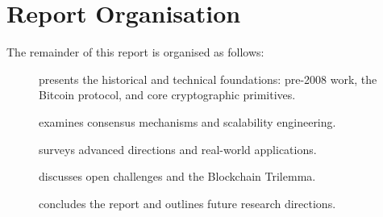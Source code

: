 \section{Report Organisation}

The remainder of this report is organised as follows:
\begin{description}
    \item[] presents the historical and technical foundations: pre-2008 work, the Bitcoin protocol, and core cryptographic primitives.
    \item[] examines consensus mechanisms and scalability engineering.
    \item[] surveys advanced directions and real-world applications.
    \item[] discusses open challenges and the Blockchain Trilemma.
    \item[] concludes the report and outlines future research directions.
\end{description}
